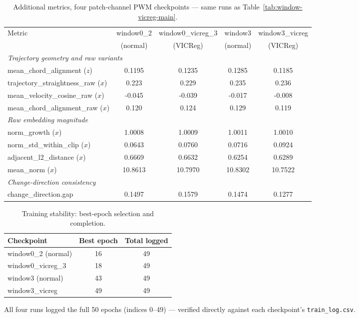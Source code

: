 \begin{table}[H]
\centering
\caption{Additional metrics, four patch-channel PWM checkpoints --- same runs as
Table~\ref{tab:window-vicreg-main}.}
\label{tab:window-vicreg-additional}
\begin{tabular}{lcccc}
\toprule
Metric & window0\_2 & window0\_vicreg\_3 & window3 & window3\_vicreg \\
 & (normal) & (VICReg) & (normal) & (VICReg) \\
\midrule
\multicolumn{5}{l}{\textit{Trajectory geometry and raw variants}} \\
mean\_chord\_alignment ($z$) & 0.1195 & 0.1235 & 0.1285 & 0.1185 \\
trajectory\_straightness\_raw ($x$) & 0.223 & 0.229 & 0.235 & 0.236 \\
mean\_velocity\_cosine\_raw ($x$) & -0.045 & -0.039 & -0.017 & -0.008 \\
mean\_chord\_alignment\_raw ($x$) & 0.120 & 0.124 & 0.129 & 0.119 \\
\midrule
\multicolumn{5}{l}{\textit{Raw embedding magnitude}} \\
norm\_growth ($x$) & 1.0008 & 1.0009 & 1.0011 & 1.0010 \\
norm\_std\_within\_clip ($x$) & 0.0643 & 0.0760 & 0.0716 & 0.0924 \\
adjacent\_l2\_distance ($x$) & 0.6669 & 0.6632 & 0.6254 & 0.6289 \\
mean\_norm ($x$) & 10.8613 & 10.7970 & 10.8302 & 10.7522 \\
\midrule
\multicolumn{5}{l}{\textit{Change-direction consistency}} \\
change\_direction.gap & 0.1497 & 0.1579 & 0.1474 & 0.1277 \\
\bottomrule
\end{tabular}
\end{table}

\begin{table}[H]
\centering
\caption{Training stability: best-epoch selection and completion.}
\label{tab:window-vicreg-stability}
\begin{tabular}{lcc}
\toprule
Checkpoint & Best epoch & Total logged \\
\midrule
window0\_2 (normal) & 16 & 49 \\
window0\_vicreg\_3 & 18 & 49 \\
window3 (normal) & 43 & 49 \\
window3\_vicreg & 49 & 49 \\
\bottomrule
\end{tabular}

\vspace{0.3em}
{\footnotesize All four runs logged the full 50 epochs (indices 0--49) --- verified
directly against each checkpoint's \texttt{train\_log.csv}.}
\end{table}

